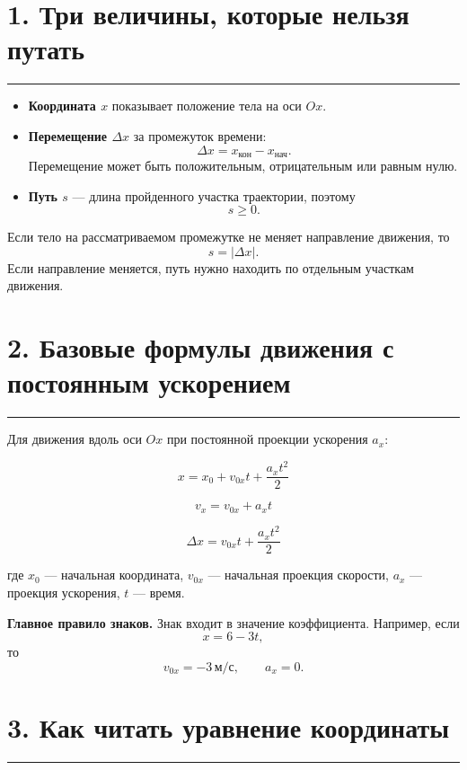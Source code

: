 \documentclass[a4paper,12pt]{article}
\newcommand{\sectionline}{%
  \vspace{0.1em}
  \noindent\textcolor{accent}{\rule{\linewidth}{0.5pt}}
  \vspace{0.45em}
}
\newcommand{\key}[1]{\textcolor{darkaccent}{\textbf{#1}}}
\newcommand{\ms}{\,\text{м/с}}
\begin{document}

\section*{1. Три величины, которые нельзя путать}
\sectionline

\begin{itemize}
  \item \key{Координата $x$} показывает положение тела на оси $Ox$.

  \item \key{Перемещение $\Delta x$} за промежуток времени:
  \[
    \boxed{\Delta x=x_{\text{кон}}-x_{\text{нач}}}.
  \]
  Перемещение может быть положительным, отрицательным или равным нулю.

  \item \key{Путь $s$} --- длина пройденного участка траектории, поэтому
  \[
    s\ge 0.
  \]
\end{itemize}

Если тело на рассматриваемом промежутке не меняет направление движения, то
\[
  s=|\Delta x|.
\]
Если направление меняется, путь нужно находить по отдельным участкам движения.

\section*{2. Базовые формулы движения с постоянным ускорением}
\sectionline

Для движения вдоль оси $Ox$ при постоянной проекции ускорения $a_x$:

\[
\boxed{x=x_0+v_{0x}t+\frac{a_xt^2}{2}}
\]

\[
\boxed{v_x=v_{0x}+a_xt}
\]

\[
\boxed{\Delta x=v_{0x}t+\frac{a_xt^2}{2}}
\]

где $x_0$ --- начальная координата, $v_{0x}$ --- начальная проекция скорости,
$a_x$ --- проекция ускорения, $t$ --- время.

\textbf{Главное правило знаков.}
Знак входит в значение коэффициента. Например, если
\[
  x=6-3t,
\]
то
\[
  v_{0x}=-3\ms,
  \qquad
  a_x=0.
\]

\section*{3. Как читать уравнение координаты}
\sectionline
\end{document}
